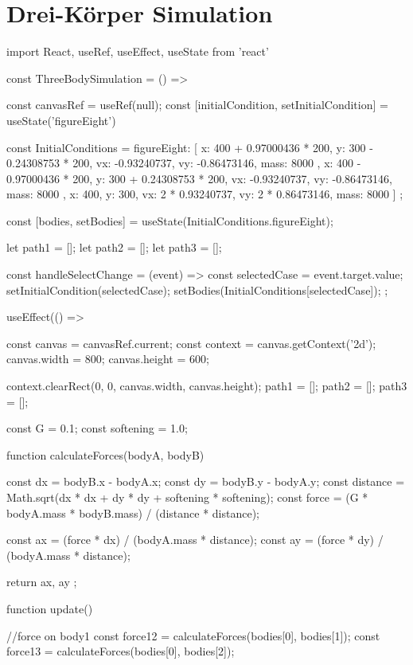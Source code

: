 \documentclass[a4paper,12pt,twoside]{article}
\begin{document}
\section{Drei-Körper Simulation}
\begin{javascript}
import React, { useRef, useEffect, useState } from 'react'

const ThreeBodySimulation = () => {

    const canvasRef = useRef(null);
    const [initialCondition, setInitialCondition] = useState('figureEight')

    const InitialConditions = {
        figureEight: [
            { x: 400 + 0.97000436 * 200, y: 300 - 0.24308753 * 200, vx: -0.93240737, vy: -0.86473146, mass: 8000 },
            { x: 400 - 0.97000436 * 200, y: 300 + 0.24308753 * 200, vx: -0.93240737, vy: -0.86473146, mass: 8000 },
            { x: 400, y: 300, vx: 2 * 0.93240737, vy: 2 * 0.86473146, mass: 8000}
        ]
    };

    const [bodies, setBodies] = useState(InitialConditions.figureEight);

    let path1 = [];
    let path2 = [];
    let path3 = [];

    const handleSelectChange = (event) => {
        const selectedCase = event.target.value;
        setInitialCondition(selectedCase);
        setBodies(InitialConditions[selectedCase]);
    };

    useEffect(() => {
        const canvas = canvasRef.current;
        const context = canvas.getContext('2d');
        canvas.width = 800;
        canvas.height = 600;

        context.clearRect(0, 0, canvas.width, canvas.height);
        path1 = [];
        path2 = [];
        path3 = [];

        const G = 0.1;
        const softening = 1.0;

        function calculateForces(bodyA, bodyB) {
            const dx = bodyB.x - bodyA.x;
            const dy = bodyB.y - bodyA.y;
            const distance = Math.sqrt(dx * dx + dy * dy + softening * softening);
            const force = (G * bodyA.mass * bodyB.mass) / (distance * distance);

            const ax = (force * dx) / (bodyA.mass * distance);
            const ay = (force * dy) / (bodyA.mass * distance);

            return { ax, ay };
        }

        function update() {
            //force on body1
            const force12 = calculateForces(bodies[0], bodies[1]);
            const force13 = calculateForces(bodies[0], bodies[2]);

}}}
\end{javascript}
\end{document}
